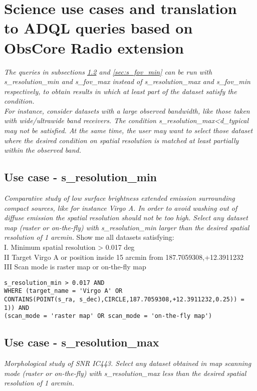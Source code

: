 \section{Science use cases and translation to ADQL queries  based on ObsCore Radio extension  }
\label{ADQLusecases}


\textit{ The  queries in subsections \ref{sec:s_resolution_max} and \ref{sec:s_fov_min}
can be run with s\_resolution\_min and s\_fov\_max instead of s\_resolution\_max and 
 s\_fov\_min respectively, to obtain results in which at least part of the dataset satisfy the condition.\\
For instance, consider datasets with a large observed bandwidth, like those taken with wide/ultrawide band receivers.
The condition s\_resolution\_max<d\_typical may not be satisfied. At the same time, the user may want to select those 
dataset where the desired condition on spatial resolution is matched at least partially  within the observed band.}

\subsection{Use case - s\_resolution\_min}
\label{sec:s_resolution_min}
\textit{Comparative study of low surface brightness extended emission surrounding compact sources, like for instance Virgo A.
In order to avoid washing out of diffuse emission the spatial resolution should not be too high.
Select any dataset map (raster or on-the-fly) with s\_resolution\_min larger than the desired spatial resolution of 1 arcmin.}
Show me all datasets satisfying: \\
I. Minimum spatial resolution > 0.017 deg \\
II Target Virgo A or position inside 15 arcmin from 187.7059308,+12.3911232 \\
III Scan mode is raster map or on-the-fly map

\begin{verbatim}
s_resolution_min > 0.017 AND
WHERE (target_name = 'Virgo A' OR
CONTAINS(POINT(s_ra, s_dec),CIRCLE,187.7059308,+12.3911232,0.25)) = 1)) AND
(scan_mode = 'raster map' OR scan_mode = 'on-the-fly map')
\end{verbatim}

\subsection{Use case - s\_resolution\_max}
\label{sec:s_resolution_max}
\textit{Morphological study of SNR IC443. Select any dataset obtained in map scanning mode (raster or on-the-fly) with s\_resolution\_max less than the desired spatial resolution of 1 arcmin.}


